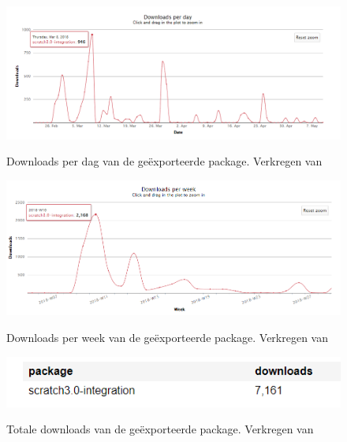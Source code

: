 \newpage

\begin{figure}
	\begin{center}
		\caption{Downloads per dag van de geëxporteerde package. Verkregen van \textcite{npm}}
		\includegraphics[width=16cm]{img/package-downloads-day}\\[0.5cm]
	\end{center}
\end{figure}
\begin{figure}
	\begin{center}
		\caption{Downloads per week van de geëxporteerde package. Verkregen van \textcite{npm}}
		\includegraphics[width=16cm]{img/package-downloads-week}\\[0.5cm]
	\end{center}
\end{figure}
\begin{figure}
	\begin{center}
		\caption{Totale downloads van de geëxporteerde package. Verkregen van \textcite{npm}}
		\includegraphics[width=16cm]{img/package-total-downloads}\\[0.5cm]
	\end{center}
\end{figure}